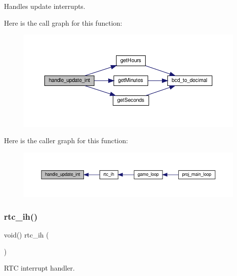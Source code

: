 Handles update interrupts. 

Here is the call graph for this function\+:
\nopagebreak
\begin{figure}[H]
\begin{center}
\leavevmode
\includegraphics[width=350pt]{group__rtc_ga9f92f313c3714cb364715862d8737cd4_cgraph}
\end{center}
\end{figure}
Here is the caller graph for this function\+:
\nopagebreak
\begin{figure}[H]
\begin{center}
\leavevmode
\includegraphics[width=350pt]{group__rtc_ga9f92f313c3714cb364715862d8737cd4_icgraph}
\end{center}
\end{figure}
\mbox{\label{group__rtc_ga0b9ae809cf571f61e54712a23c65348e}} 
\subsubsection{\texorpdfstring{rtc\+\_\+ih()}{rtc\_ih()}}
{\footnotesize\ttfamily void() rtc\+\_\+ih (\begin{DoxyParamCaption}{ }\end{DoxyParamCaption})}



R\+TC interrupt handler. 

\mbox{\label{group__rtc_ga6bbe679f115cec90d36d50eb2aac1b89}} 
